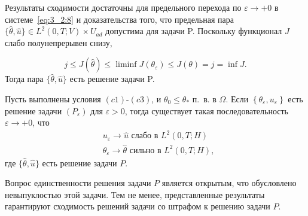 Результаты сходимости достаточны для предельного
перехода по $\varepsilon \rightarrow+0$ в системе~\eqref{eq:3_2:8}
и доказательства того, что предельная пара
$\{\widehat{\theta}, \widehat{u}\} \in L ^{2}(0, T ; V) \times U_{a d}$
допустима для задачи P\@.
Поскольку функционал $J$ слабо полунепрерывен снизу,

\[
    j \leq J(\widehat{\theta})
    \leq \liminf J \left(\theta_{\varepsilon}\right)
    \leq J(\theta)=j=\inf J.
\]
Тогда пара $\{\widehat{\theta}, \widehat{u}\}$ есть решение задачи P\@.

\begin{theorem}
    \label{th:3_2:3}
    Пусть выполнены условия $(c1)$-$(c3)$, и $\theta_{0} \leq \theta_{*}$ п.\ в. в $\Omega$.
    Если $\left\{\theta_{\varepsilon}, u_{\varepsilon}\right\}$ есть решение задачи
    $\left(P_{\varepsilon}\right)$ для $\varepsilon>0$, тогда существует
    такая последовательность $\varepsilon \rightarrow+0$, что
    \[
        \begin{aligned}
            &u_{\varepsilon} \rightarrow \widehat{u} \text { слабо в } L^{2}(0, T ; H) \\
            &\theta_{\varepsilon} \rightarrow \widehat{\theta} \text { сильно в } L^{2}(0, T ; H),
        \end{aligned}
    \]
    где $\{\widehat{\theta}, \widehat{u}\}$ есть решение задачи $P$\@.
\end{theorem}

\begin{remark}
    Вопрос единственности решения задачи $P$ является открытым, что обусловлено невыпуклостью этой задачи.
    Тем не менее, представленные результаты гарантируют сходимость решений задачи со штрафом
    к решению задачи $P$.
\end{remark}
